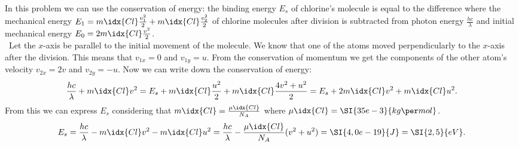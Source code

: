 \documentclass[11pt]{article}
\begin{document}

\solueng
In this problem we can use the conservation of energy: the binding energy $E_s$ of chlorine’s molecule is equal to the difference where the mechanical energy $E_1 = m\idx{Cl} \frac{v_1^2}{2} + m\idx{Cl} \frac{v_2^2}{2}$ of chlorine molecules after division is subtracted from photon energy $\frac{hc}{\lambda}$ and initial mechanical energy $E_0 = 2m\idx{Cl} \frac{v^2}{2} $.\\\    
Let the $x$-axis be parallel to the initial movement of the molecule. We know that one of the atoms moved perpendicularly to the $x$-axis after the division. This means that $v_{1x} = 0$ and $v_{1y} = u$. From the conservation of momentum we get the components of the other atom’s velocity $v_{2x} = 2 v$ and $v_{2y} = -u$. Now we can write down the conservation of energy:
$$
	\frac{hc}{\lambda} + m\idx{Cl} v^2  = E_s + m\idx{Cl} \frac{u^2}{2} + m\idx{Cl} \frac{4v^2 + u^2}{2} = E_s + 2 m\idx{Cl} v^2 + m\idx{Cl} u^2.
$$ 
From this we can express $E_s$ considering that $m\idx{Cl} = \frac{\mu\idx{Cl}}{N_A}$ where $\mu\idx{Cl} = \SI{35e-3}{kg\per mol}$.
$$ E_s = \frac{hc}{\lambda} - m\idx{Cl} v^2 - m\idx{Cl} u^2 = \frac{hc}{\lambda} - \frac{\mu\idx{Cl}}{N_A} (v^2 + u^2) = \SI{4,0e-19}{J} = \SI{2,5}{eV}.
$$
\probend
\bigskip

\end{document}
